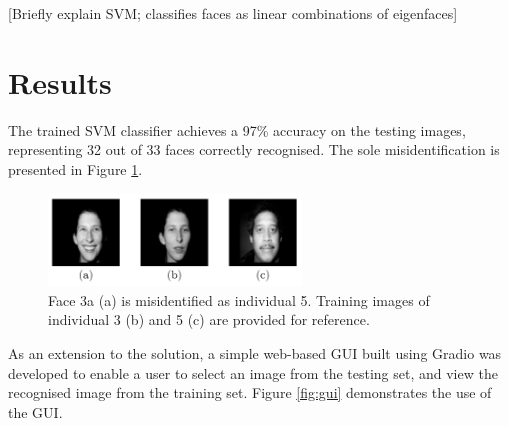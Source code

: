 [Briefly explain SVM; classifies faces as linear combinations of eigenfaces]

\newpage
\section{Results}

The trained SVM classifier achieves a 97\% accuracy on the testing images, representing 32 out of 33 faces correctly recognised. The sole misidentification is presented in Figure \ref{fig:misidentification}.

\begin{figure}[ht]
  \centering
  \includegraphics[width=0.6\textwidth]{images/q3_misidentification.png}
  \caption{Face 3a (a) is misidentified as individual 5. Training images of individual 3 (b) and 5 (c) are provided for reference.}
  \label{fig:misidentification}
\end{figure}

As an extension to the solution, a simple web-based GUI built using Gradio \cite{gradio_2023} was developed to enable a user to select an image from the testing set, and view the recognised image from the training set. Figure \ref{fig:gui} demonstrates the use of the GUI.

